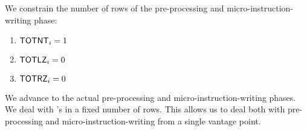 \begin{center}
\end{center}
We constrain the number of rows of the pre-processing and micro-instruction-writing phase:
\begin{enumerate}
	\item $\textsf{TOTNT}_{i} = 1$
	\item $\textsf{TOTLZ}_{i} = 0$
	\item $\textsf{TOTRZ}_{i} = 0$
\end{enumerate}
We advance to the actual pre-processing and micro-instruction-writing phases.
We deal with \mmuInstMstoreEight{}'s in a fixed number of rows.
This allows us to deal both with pre-processing and micro-instruction-writing from a single vantage point. 
